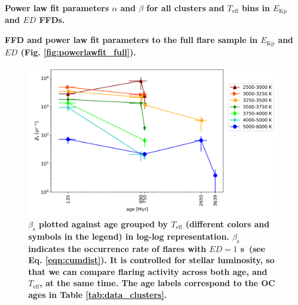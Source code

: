 \documentclass{aa}
\begin{document}
\begin{table}
\caption{\textbf{Power law fit parameters $\alpha$ and $\beta$ for all clusters and $T_\mathrm{eff}$ bins in $E_\mathrm{Kp}$ and $ED$ FFDs.}}
\label{tab:powerlawtable_spt}
\centering

\end{table}

\begin{table}
\caption{\textbf{FFD and power law fit parameters to the full flare sample in $E_\mathrm{Kp}$ and $ED$ (Fig. \ref{fig:powerlawfit_full}).}}
\label{tab:powerlawtable_fullsample}
\centering

\end{table}

\begin{figure}[ht!]
    \centering
    \includegraphics[width=15.5cm]{pics/FFDs/beta_T_age_ED_wheatland.png}
    \caption{\textbf{$\beta_\mathrm{s}$ plotted against age grouped by $T_\mathrm{eff}$ (different colors and symbols in the legend) in log-log representation. $\beta_\mathrm{s}$ indicates the occurrence rate of flares with $ED=1$ s~(see Eq. \ref{eqn:cumdist}). It is controlled for stellar luminosity, so that we can compare flaring activity across both age, and $T_\mathrm{eff}$, at the same time. The age labels correspond to the OC ages in Table \ref{tab:data_clusters}.}}          	
    \label{fig:beta_T_age}
\end{figure}
\end{document}
